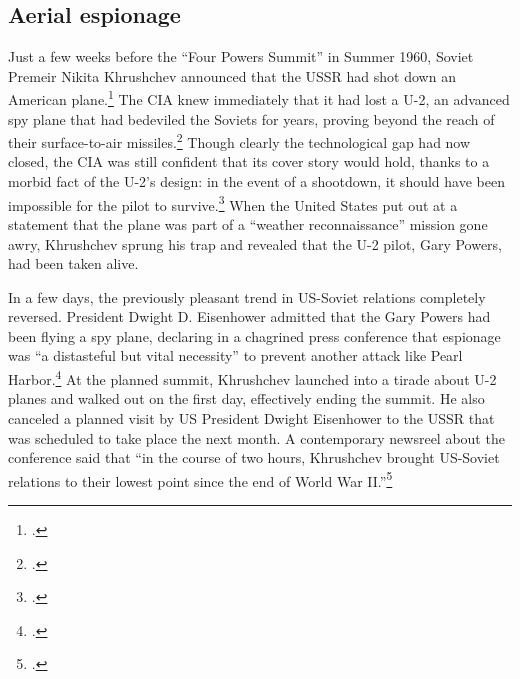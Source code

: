 \documentclass[14pt]{extarticle}
\begin{document}


\subsection{Aerial espionage}

Just a few weeks before the \enquote{Four Powers Summit} in Summer 1960, Soviet Premeir Nikita Khrushchev announced that the USSR had shot down an American plane.\footcite[p.~112]{powers_operation_2004} The CIA knew immediately that it had lost a U-2, an advanced spy plane that had bedeviled the Soviets for years, proving beyond the reach of their surface-to-air missiles.\footcite{orlov_u-2_2007} Though clearly the technological gap had now closed, the CIA was still confident that its cover story would hold, thanks to a morbid fact of the U-2's design: in the event of a shootdown, it should have been impossible for the pilot to survive.\footcite[p.~35]{lindgren_trust_2000} When the United States put out at a statement that the plane was part of a \enquote{weather reconnaissance} mission gone awry, Khrushchev sprung his trap and revealed that the U-2 pilot, Gary Powers, had been taken alive.

In a few days, the previously pleasant trend in US-Soviet relations completely reversed. President Dwight D. Eisenhower admitted that the Gary Powers had been flying a spy plane, declaring in a chagrined press conference that espionage was ``a distasteful but vital necessity'' to prevent another attack like Pearl Harbor.\footcite{eisenhower_news_1960} At the planned summit, Khrushchev launched into a tirade about U-2 planes and walked out on the first day, effectively ending the summit. He also canceled a planned visit by US President Dwight Eisenhower to the USSR that was scheduled to take place the next month. A contemporary newsreel about the conference said that \enquote{in the course of two hours, Khrushchev brought US-Soviet relations to their lowest point since the end of World War II.}\footcite{universal_studios_summit_1960}
\end{document}
